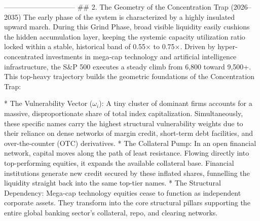 ------------------------------
## 2. The Geometry of the Concentration Trap (2026–2035)
The early phase of the system is characterized by a highly insulated upward march. During this Grind Phase, broad visible liquidity easily cushions the hidden accumulation layer, keeping the systemic capacity utilization ratio locked within a stable, historical band of 0.55× to 0.75×.
Driven by hyper-concentrated investments in mega-cap technology and artificial intelligence infrastructure, the S&P 500 executes a steady climb from 6,800 toward 9,500+. This top-heavy trajectory builds the geometric foundations of the Concentration Trap:

* The Vulnerability Vector ($\omega_i$): A tiny cluster of dominant firms accounts for a massive, disproportionate share of total index capitalization. Simultaneously, these specific names carry the highest structural vulnerability weights due to their reliance on dense networks of margin credit, short-term debt facilities, and over-the-counter (OTC) derivatives.
* The Collateral Pump: In an open financial network, capital moves along the path of least resistance. Flowing directly into top-performing equities, it expands the available collateral base. Financial institutions generate new credit secured by these inflated shares, funnelling the liquidity straight back into the same top-tier names.
* The Structural Dependency: Mega-cap technology equities cease to function as independent corporate assets. They transform into the core structural pillars supporting the entire global banking sector's collateral, repo, and clearing networks.

